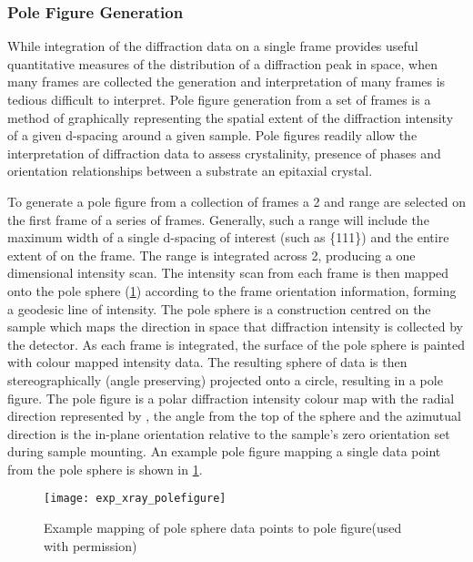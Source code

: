 \subsubsection{Pole Figure Generation}
While integration of the diffraction data on a single frame provides useful quantitative measures of the distribution of a diffraction peak in space, when many frames are collected the generation and interpretation of many frames is tedious difficult to interpret. Pole figure generation from a set of frames is a method of graphically representing the spatial extent of the diffraction intensity of a given d-spacing around a given sample. Pole figures readily allow the interpretation of diffraction data to assess crystalinity, presence of phases and orientation relationships between a substrate an epitaxial crystal.

To generate a pole figure from a collection of frames a 2\straighttheta{} and \textchi{} range are selected on the first frame of a series of frames. Generally, such a range will include the maximum width of a single d-spacing of interest (such as \{111\}) and the entire extent of \textchi{} on the frame. The range is integrated across 2\straighttheta{}, producing a one dimensional intensity scan. The intensity scan from each frame is then mapped onto the pole sphere (\cref{fig:exp_xray_polefigure}) according to the frame orientation information, forming a geodesic line of intensity. The pole sphere is a construction centred on the sample which maps the direction in space that diffraction intensity is collected by the detector. As each frame is integrated, the surface of the pole sphere is painted with colour mapped intensity data. The resulting sphere of data is then stereographically (angle preserving) projected onto a circle, resulting in a pole figure\cite{He2009}. The pole figure is a polar diffraction intensity colour map with the radial direction represented by \textalpha{}, the angle from the top of the sphere and the azimutual direction \textphi{} is the in-plane orientation relative to the sample's \textphi{} zero orientation set during sample mounting. An example pole figure mapping a single data point from the pole sphere is shown in \cref{fig:exp_xray_polefigure}. 
\begin{figure}
    \centering
    \texttt{[image: exp\_xray\_polefigure]}
    \caption[Mapping of pole sphere to pole figure]{\label{fig:exp_xray_polefigure}Example mapping of pole sphere data points to pole figure\cite{He2009}(used with permission)}
\end{figure}

